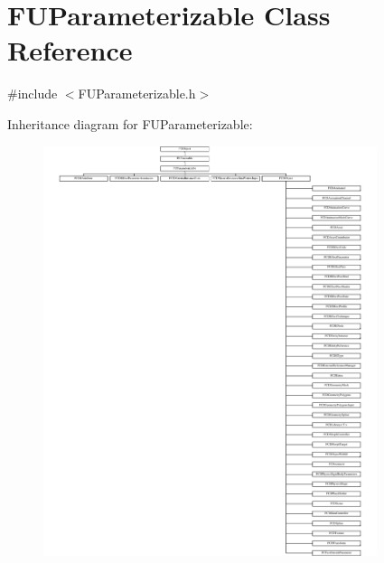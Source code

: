 \hypertarget{classFUParameterizable}{
\section{FUParameterizable Class Reference}
\label{classFUParameterizable}
}


{\ttfamily \#include $<$FUParameterizable.h$>$}

Inheritance diagram for FUParameterizable:\begin{figure}[H]
\begin{center}
\leavevmode
\includegraphics[height=12.000000cm]{classFUParameterizable}
\end{center}
\end{figure}

